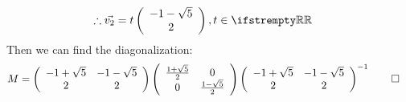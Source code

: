 \documentclass[12pt, a4paper]{article}
\begin{document}
\begin{enumerate}[Q\arabic*.]
\begin{enumerate}[(\alph*)]
\begin{align*}
        \therefore \vec{v_2} &= t\left(\begin{array}{c} -1-\sqrt{5}\\ 2 \end{array}\right), t\in\RR
      \end{align*}
      Then we can find the diagonalization:
      \begin{align*}
        M &= \left(\begin{array}{cc} -1+\sqrt{5} & -1-\sqrt{5}\\ 2 & 2\end{array}\right) \left(\begin{array}{cc} \frac{1+\sqrt{5}}{2} & 0\\ 0 & \frac{1-\sqrt{5}}{2}\end{array}\right)\left(\begin{array}{cc} -1+\sqrt{5} & -1-\sqrt{5}\\ 2 & 2\end{array}\right)^{-1} \qed 
      \end{align*}


\end{enumerate}
\end{enumerate}
\end{document}
